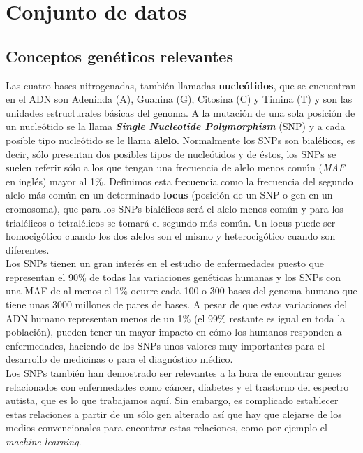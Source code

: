 
\chapter{Conjunto de datos}\label{Conjunto}

\section{Conceptos genéticos relevantes}\label{st:conceptos-geneticos}
Las cuatro bases nitrogenadas, también llamadas \textbf{nucleótidos}, que se encuentran en el ADN son Adeninda (A), Guanina (G), Citosina (C) y Timina (T) y son las unidades estructurales básicas del genoma. A la mutación de una sola posición de un nucleótido se la llama \textbf{\textit{Single Nucleotide Polymorphism}} (SNP) y a cada posible tipo nucleótido se le llama \textbf{alelo}. Normalmente los SNPs son bialélicos, es decir, sólo presentan dos posibles tipos de nucleótidos y de éstos, los SNPs se suelen referir sólo a los que tengan una frecuencia de alelo menos común (\textit{MAF} en inglés) mayor al 1\%. Definimos esta frecuencia como la frecuencia del segundo alelo más común en un determinado \textbf{locus} (posición de un SNP o gen en un cromosoma), que para los SNPs bialélicos será el alelo menos común y para los trialélicos o tetralélicos se tomará el segundo más común. Un locus puede ser homocigótico cuando los dos alelos son el mismo y heterocigótico cuando son diferentes. \cite{su2007single}\\
Los SNPs tienen un gran interés en el estudio de enfermedades puesto que representan el 90\% de todas las variaciones genéticas humanas y los SNPs con una MAF de al menos el 1\% ocurre cada 100 o 300 bases del genoma humano que tiene unas 3000 millones de pares de bases. A pesar de que estas variaciones del ADN humano representan menos de un 1\% (el 99\% restante es igual en toda la población), pueden tener un mayor impacto en cómo los humanos responden a enfermedades, haciendo de los SNPs unos valores muy importantes para el desarrollo de medicinas o para el diagnóstico médico. \cite{su2007single}\\
Los SNPs también han demostrado ser relevantes a la hora de encontrar genes relacionados con enfermedades como cáncer, diabetes y el trastorno del espectro autista, que es lo que trabajamos aquí. Sin embargo, es complicado establecer estas relaciones a partir de un sólo gen alterado así que hay que alejarse de los medios convencionales para encontrar estas relaciones, como por ejemplo el \textit{machine learning}. \cite{su2007single}\\\\
